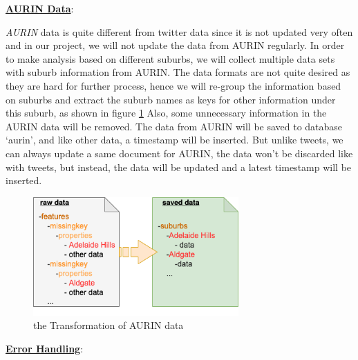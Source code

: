 \documentclass{article}
\begin{document}
\textbf{\underline{AURIN Data}}: 

\textit{AURIN} data is quite different from twitter data since it is not updated very often and in our project, we will not update the data from AURIN regularly. In order to make analysis based on different suburbs, we will collect multiple data sets with suburb information from AURIN. The data formats are not quite desired as they are hard for further process, hence we will re-group the information based on suburbs and extract the suburb names as keys for other information under this suburb, as shown in figure \ref{fig:aurindata} Also, some unnecessary information in the AURIN data will be removed. The data from AURIN will be saved to database ‘aurin’, and like other data, a timestamp will be inserted. But unlike tweets, we can always update a same document for AURIN, the data won’t be discarded like with tweets, but instead, the data will be updated and a latest timestamp will be inserted.
\begin{figure}[htp]
\centering
\includegraphics[width=0.7\textwidth]{img/aurindata.png}
\caption{the Transformation of AURIN data}
\label{fig:aurindata}
\end{figure}

\textbf{\underline{Error Handling}}: 
\end{document}
